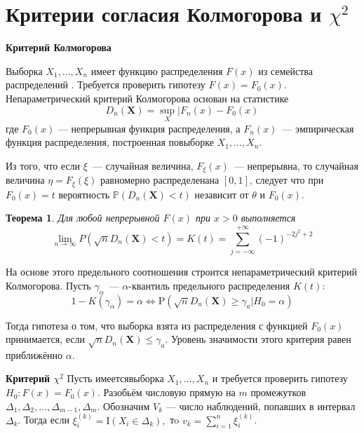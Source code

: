 \documentclass[oneside,final,14pt]{extreport}
\newtheorem{thm}{Теорема}[section]
\theoremstyle{definition}
\begin{document}
\section{Критерии согласия Колмогорова и $\chi^{2}$}

{\bf Критерий Колмогорова}

Выборка $X_1, \ldots, X_n$ имеет функцию распределения $F(x)$ из семейства распределений . Требуется проверить гипотезу $F(x)=F_{0}(x)$. Непараметрический критерий Колмогорова основан на статистике
\begin{equation*}
    D_{n}(\mathbf{X})=\sup _{X} | F_{n}(x)-F_{0}(x)
\end{equation*}
где $F_{0}(x)$  —  непрерывная функция распределения, а $F_{n}(x)$~---  эмпирическая функция распределения, построенная повыборке $X_1, \ldots, X_n$.

Из того, что если $\xi$~--- случайная величина, $F_{\xi}(x)$~--- непрерывна, то случайная величина $\eta=F_{\xi}(\xi)$ равномерно распределенана $[0,1]$, следует что при $F_{0}(x)=t$ вероятность $\mathbb{P}\left(D_{n}(\mathbf{X})<t\right)$ независит от $\theta$ и $F_{0}(x)$.

\begin{thm}
    Для любой непрерывной $F(x)$ при $x > 0$ выполняется
    \begin{equation*}
        \lim _{n \to \infty} P\left(\sqrt{n} D_{n}(\mathbf{X})<t\right)=K(t)=\sum_{j=-\infty}^{+\infty}(-1)^{-2 j^{2}+2}
    \end{equation*}
\end{thm}

На основе этого предельного соотношения строится непараметрический критерий Колмогорова. Пусть $\gamma_{\alpha}$~--- $\alpha$-квантиль предельного распределения $K(t)$:
\begin{equation*}
    1-K\left(\gamma_{\alpha}\right)=\alpha \Leftrightarrow \mathrm{P}\left(\sqrt{n} D_{n}(\mathbf{X}) \geq \gamma_{a} | H_{0}=\alpha\right)
\end{equation*}

Тогда гипотеза о том, что выборка взята из распределения с функцией $F_{0}(x)$ принимается, если $\sqrt{n} D_{n}(\mathbf{X}) \leqslant \gamma_{a}$. Уровень значимости этого критерия равен приближённо $\alpha$.

{\bf Критерий $\chi^{2}$}
Пусть имеетсявыборка $X_1, \ldots, X_n$ и требуется проверить гипотезу $H_{0}: F(x)=F_{0}(x)$. Разобьём числовую прямую на $m$ промежутков $\Delta_{1}, \Delta_{2}, \ldots, \Delta_{m-1}, \Delta_{m}$. Обозначим $V_{k}$ — число наблюдений, попавших в интервал $\Delta_{k}$. Тогда если $\xi_{i}^{(k)}=\mathrm{I}\left(X_{i} \in \Delta_{k}\right),$ тo $v_{k}=\sum_{i=1}^{n} \xi_{i}^{(k)}$.
\end{document}
